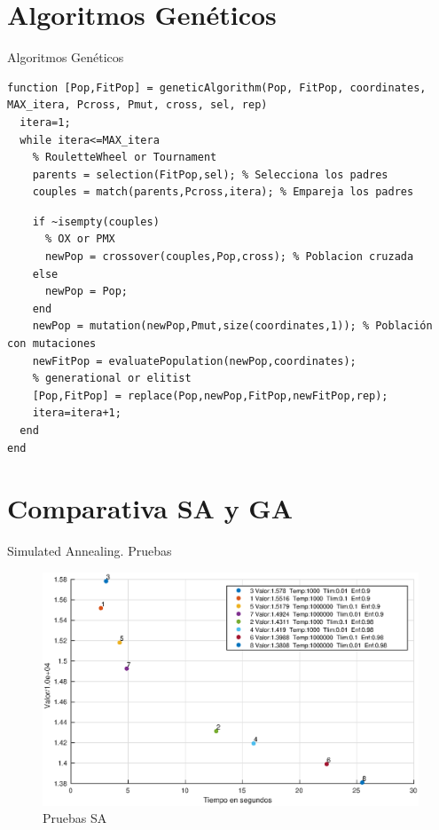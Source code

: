 \documentclass{beamer}
\begin{document}
\section{Algoritmos Genéticos}
\begin{frame}[fragile]{Algoritmos Genéticos}
\begin{verbatim}
function [Pop,FitPop] = geneticAlgorithm(Pop, FitPop, coordinates, MAX_itera, Pcross, Pmut, cross, sel, rep)
  itera=1;
  while itera<=MAX_itera
    % RouletteWheel or Tournament
    parents = selection(FitPop,sel); % Selecciona los padres
    couples = match(parents,Pcross,itera); % Empareja los padres
\end{verbatim}
\end{frame}

\begin{frame}[fragile]
\begin{verbatim}
    if ~isempty(couples)
      % OX or PMX
      newPop = crossover(couples,Pop,cross); % Poblacion cruzada
    else
      newPop = Pop;
    end
    newPop = mutation(newPop,Pmut,size(coordinates,1)); % Población con mutaciones
    newFitPop = evaluatePopulation(newPop,coordinates);
    % generational or elitist
    [Pop,FitPop] = replace(Pop,newPop,FitPop,newFitPop,rep);
    itera=itera+1;
  end
end
\end{verbatim}
\end{frame}



\section{Comparativa SA y GA}
\begin{frame}{Simulated Annealing. Pruebas}
  \begin{center}
    \begin{figure}
      \includegraphics[scale=0.45]{../SA/statsSA.eps}
      \caption{Pruebas SA}
      \label{fig:statsSA}
    \end{figure}
  \end{center}
\end{frame}
\end{document}
